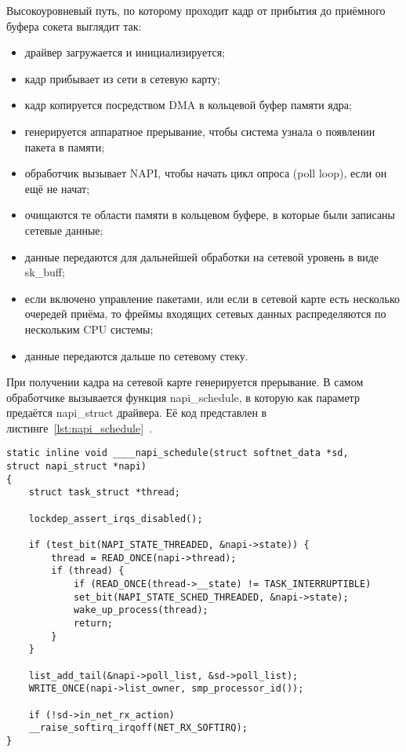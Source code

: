 Высокоуровневый путь, по которому проходит кадр от прибытия до приёмного буфера сокета выглядит так:
\begin{itemize}[label=---]
	\item драйвер загружается и инициализируется;
	\item кадр прибывает из сети в сетевую карту;
	\item кадр копируется посредством DMA в кольцевой буфер памяти ядра;
	\item генерируется аппаратное прерывание, чтобы система узнала о появлении пакета в памяти;
	\item обработчик вызывает NAPI, чтобы начать цикл опроса (poll loop), если он ещё не начат;
	\item очищаются те области памяти в кольцевом буфере, в которые были записаны сетевые данные;
	\item данные передаются для дальнейшей обработки на сетевой уровень в виде sk\_buff;
	\item если включено управление пакетами, или если в сетевой карте есть несколько очередей приёма, то фреймы входящих сетевых данных распределяются по нескольким CPU системы;
	\item данные передаются дальше по сетевому стеку.
\end{itemize}

При получении кадра на сетевой карте генерируется прерывание. В самом обработчике вызывается функция napi\_schedule, в которую как параметр предаётся napi\_struct драйвера. Её код представлен в листинге~\ref{lst:napi_schedule}~\cite{napi_schedule}.

\begin{center}
	\captionsetup{justification=raggedright,singlelinecheck=off}
	\begin{lstlisting}[label=lst:napi_schedule,caption=Функция \_\_\_\_napi\_schedule,showstringspaces=false]
static inline void ____napi_schedule(struct softnet_data *sd,
struct napi_struct *napi)
{
	struct task_struct *thread;
	
	lockdep_assert_irqs_disabled();
	
	if (test_bit(NAPI_STATE_THREADED, &napi->state)) {
		thread = READ_ONCE(napi->thread);
		if (thread) {
			if (READ_ONCE(thread->__state) != TASK_INTERRUPTIBLE)
			set_bit(NAPI_STATE_SCHED_THREADED, &napi->state);
			wake_up_process(thread);
			return;
		}
	}
	
	list_add_tail(&napi->poll_list, &sd->poll_list);
	WRITE_ONCE(napi->list_owner, smp_processor_id());

	if (!sd->in_net_rx_action)
	__raise_softirq_irqoff(NET_RX_SOFTIRQ);
}
	\end{lstlisting}
\end{center}
\FloatBarrier

